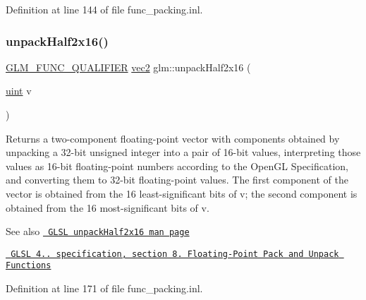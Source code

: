 Definition at line 144 of file func\+\_\+packing.\+inl.

\mbox{\label{group__core__func__packing_ga90be544929ed83fa7039208bbab8c0ba}} 
\subsubsection{\texorpdfstring{unpackHalf2x16()}{unpackHalf2x16()}}
{\footnotesize\ttfamily \mbox{\hyperlink{setup_8hpp_a33fdea6f91c5f834105f7415e2a64407}{G\+L\+M\+\_\+\+F\+U\+N\+C\+\_\+\+Q\+U\+A\+L\+I\+F\+I\+ER}} \mbox{\hyperlink{group__core__types_gaa1618f51db67eaa145db101d8c8431d8}{vec2}} glm\+::unpack\+Half2x16 (\begin{DoxyParamCaption}\item[{\mbox{\hyperlink{group__core__precision_ga4fd29415871152bfb5abd588334147c8}{uint}}}]{v }\end{DoxyParamCaption})}

Returns a two-\/component floating-\/point vector with components obtained by unpacking a 32-\/bit unsigned integer into a pair of 16-\/bit values, interpreting those values as 16-\/bit floating-\/point numbers according to the Open\+GL Specification, and converting them to 32-\/bit floating-\/point values. The first component of the vector is obtained from the 16 least-\/significant bits of v; the second component is obtained from the 16 most-\/significant bits of v.

\begin{DoxySeeAlso}{See also}
\href{http://www.opengl.org/sdk/docs/manglsl/xhtml/unpackHalf2x16.xml}{\texttt{ G\+L\+SL unpack\+Half2x16 man page}} 

\href{http://www.opengl.org/registry/doc/GLSLangSpec.4.20.8.pdf}{\texttt{ G\+L\+SL 4.. specification, section 8. Floating-\/\+Point Pack and Unpack Functions}} 
\end{DoxySeeAlso}


Definition at line 171 of file func\+\_\+packing.\+inl.

\mbox{\label{group__core__func__packing_gae5f30f599243df9525315edecae09a7f}} 
